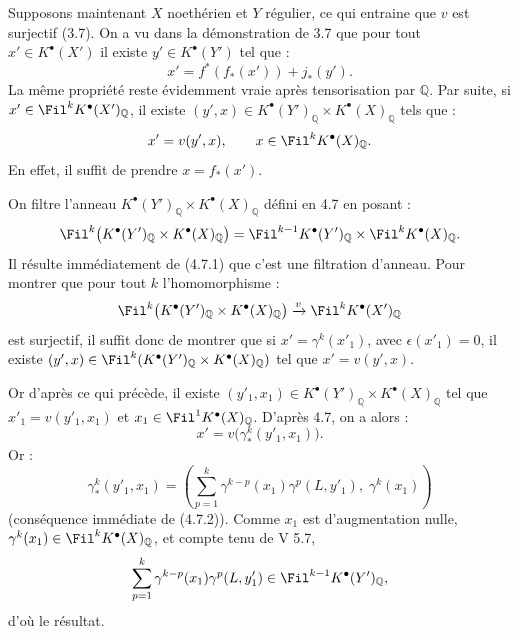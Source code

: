 
Supposons maintenant \(X\) noethérien et \(Y\) régulier, ce qui entraine que \(v\) est surjectif (3.7). On a vu dans la démonstration de 3.7 que pour tout \(x'\in K^{\bullet}(X')\) il existe \(y'\in K^{\bullet}(Y')\) tel que :
\[
  x'=f^*(f_*(x'))+j_*(y').
\]
La même propriété reste évidemment vraie après tensorisation par \(\mathbb Q\). Par suite, si \(x'\in\Fil^kK^{\bullet}(X')_{\mathbb Q}\), il existe \((y',x)\in K^{\bullet}(Y')_{\mathbb Q}\times K^{\bullet}(X)_{\mathbb Q}\) tels que :
\[
  x'=v(y',x),\qquad x\in\Fil^kK^{\bullet}(X)_{\mathbb Q}.
\]
En effet, il suffit de prendre \(x=f_*(x')\).

On filtre l'anneau \(K^{\bullet}(Y')_{\mathbb Q}\times K^{\bullet}(X)_{\mathbb Q}\) défini en 4.7 en posant :
\[
  \Fil^k\bigl(K^{\bullet}(Y')_{\mathbb Q}\times K^{\bullet}(X)_{\mathbb Q}\bigr)
  =
  \Fil^{k-1}K^{\bullet}(Y')_{\mathbb Q}\times \Fil^kK^{\bullet}(X)_{\mathbb Q}.
\]
Il résulte immédiatement de (4.7.1) que c'est une filtration d'anneau. Pour montrer que pour tout \(k\) l'homomorphisme :
\[
  \Fil^k\bigl(K^{\bullet}(Y')_{\mathbb Q}\times K^{\bullet}(X)_{\mathbb Q}\bigr)
  \xrightarrow{v}
  \Fil^kK^{\bullet}(X')_{\mathbb Q}
\]
est surjectif, il suffit donc de montrer que si \(x'= \gamma^k(x'_1)\), avec \(\epsilon(x'_1)=0\), il existe \((y',x)\in\Fil^k(K^{\bullet}(Y')_{\mathbb Q}\times K^{\bullet}(X)_{\mathbb Q})\) tel que \(x'=v(y',x)\).

Or d'après ce qui précède, il existe \((y'_1,x_1)\in K^{\bullet}(Y')_{\mathbb Q}\times K^{\bullet}(X)_{\mathbb Q}\) tel que \(x'_1=v(y'_1,x_1)\) et \(x_1\in\Fil^1K^{\bullet}(X)_{\mathbb Q}\). D'après 4.7, on a alors :
\[
  x'=v\bigl(\gamma^k_*(y'_1,x_1)\bigr).
\]
Or :
\[
  \gamma^k_*(y'_1,x_1)
  =
  \left(\sum_{p=1}^{k}\gamma^{k-p}(x_1)\gamma^p(L,y'_1),\;
  \gamma^k(x_1)\right)
\]
(conséquence immédiate de (4.7.2)). Comme \(x_1\) est d'augmentation nulle, \(\gamma^k(x_1)\in\Fil^kK^{\bullet}(X)_{\mathbb Q}\), et compte tenu de V 5.7,
\[
  \sum_{p=1}^{k}\gamma^{k-p}(x_1)\gamma^p(L,y'_1)
  \in\Fil^{k-1}K^{\bullet}(Y')_{\mathbb Q},
\]
d'où le résultat.

